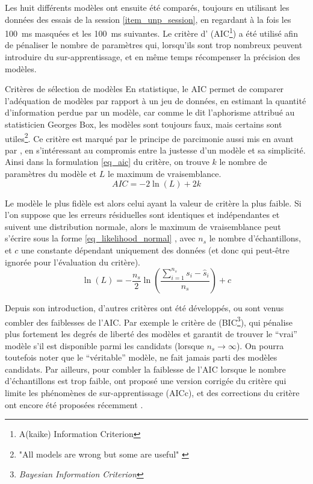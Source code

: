 Les huit différents modèles ont ensuite été comparés, toujours en utilisant les données des essais de la session \cref{item_unp_session}, en regardant à la fois les \SI{100}{\milli\second} masquées et les \SI{100}{\milli\second} suivantes. Le critère d'\textcite{akaike_new_1974} (AIC\footnote{A(kaike) Information Criterion}) a été utilisé afin de pénaliser le nombre de paramètres qui, lorsqu'ils sont trop nombreux peuvent introduire du sur-apprentissage, et en même temps récompenser la précision des modèles.

\begin{aside}{Critères de sélection de modèles}
	En statistique, le AIC permet de comparer l'adéquation de modèles par rapport à un jeu de données, en estimant la quantité d'information perdue par un modèle, car comme le dit l'aphorisme attribué au statisticien Georges Box, les modèles sont toujours faux, mais certains sont utiles\footnote{"All models are wrong but some are useful" \parencite{box_robustness_1979}}. Ce critère est marqué par le principe de parcimonie aussi mis en avant par \textcite{box_science_1976}, en s'intéressant au compromis entre la justesse d'un modèle et sa simplicité. Ainsi dans la formulation \cref{eq_aic} du critère, on trouve $k$ le nombre de paramètres du modèle et $L$ le maximum de vraisemblance.
	\begin{equation} \label{eq_aic}
	AIC = -2\ln(L) + 2k
	\end{equation}
	
	Le modèle le plus fidèle est alors celui ayant la valeur de critère la plus faible. Si l'on suppose que les erreurs résiduelles sont identiques et indépendantes et suivent une distribution normale, alors le maximum de vraisemblance peut s'écrire sous la forme \cref{eq_likelihood_normal} \parencite[p~217]{akaike_information_1998}, avec $n_s$ le nombre d'échantillons, et $c$ une constante dépendant uniquement des données (et donc qui peut-être ignorée pour l'évaluation du critère).
	\begin{equation} \label{eq_likelihood_normal}
	\ln(L) = -\frac{n_s}{2}\ln\left(\frac{\sum_{i=1}^{n_s}s_i - \hat{s}_i}{n_s}\right) + c
	\end{equation}
	
	Depuis son introduction, d'autres critères ont été développés, ou sont venus combler des faiblesses de l'AIC. Par exemple le critère de \textcite{schwarz_estimating_1978} (BIC\footnote{\textit{Bayesian Information Criterion}}), qui pénalise plus fortement les degrés de liberté des modèles et garantit de trouver le \foreignquote{french}{vrai} modèle s'il est disponible parmi les candidats (lorsque $n_s\to\infty$). On pourra toutefois noter que le \foreignquote{french}{véritable} modèle, ne fait jamais parti des modèles candidats. Par ailleurs, pour combler la faiblesse de l'AIC lorsque le nombre d'échantillons est trop faible, \textcite{hurvich_regression_1989} ont proposé une version corrigée du critère qui limite les phénomènes de sur-apprentissage (AICc), et des corrections du critère ont encore été proposées récemment \parencite{delsole_correcting_2021}.
\end{aside}

